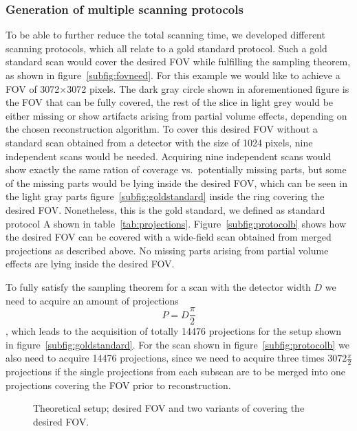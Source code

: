 \subsubsection{Generation of multiple scanning protocols}
To be able to further reduce the total scanning time, we developed different scanning protocols, which all relate to a gold standard protocol. Such a gold standard scan would cover the desired FOV while fulfilling the sampling theorem, as shown in figure~\ref{subfig:fovneed}. For this example we would like to achieve a FOV of 3072$\times$3072 pixels. The dark gray circle shown in aforementioned figure is the FOV that can be fully covered, the rest of the slice in light grey would be either missing or show artifacts arising from partial volume effects, depending on the chosen reconstruction algorithm. To cover this desired FOV without a standard scan obtained from a detector with the size of 1024 pixels, nine independent scans would be needed. Acquiring nine independent scans would show exactly the same ration of coverage vs.\ potentially missing parts, but some of the missing parts would be lying inside the desired FOV, which can be seen in the light gray parts figure~\ref{subfig:goldstandard} inside the ring covering the desired FOV. Nonetheless, this is the gold standard, we defined as standard protocol A shown in table~\ref{tab:projections}. Figure~\ref{subfig:protocolb} shows how the desired FOV can be covered with a wide-field scan obtained from merged projections as described above. No missing parts arising from partial volume effects are lying inside the desired FOV.

To fully satisfy the sampling theorem for a scan with the detector width $D$ we need to acquire an amount of projections \[P=D\frac{\pi}{2}\], which leads to the acquisition of totally 14476 projections for the setup shown in figure~\ref{subfig:goldstandard}. For the scan shown in figure~\ref{subfig:protocolb} we also need to acquire 14476 projections, since we need to acquire three times \(3072\frac{\pi}{2}\) projections if the single projections from each subscan are to be merged into one projections covering the FOV prior to reconstruction.
\cbend

\cbstart
\begin{figure*}[htp]
	\centering%
	\caption{Theoretical setup; desired FOV and two variants of covering the desired FOV.}%
	\label{fig:goldstandard}%
\end{figure*}
\cbend

